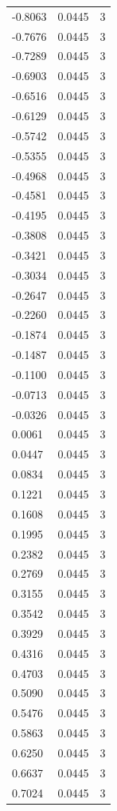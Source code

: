 \begin{longtable}{lrr}
  -0.8063 & 0.0445 & 3 \\
  -0.7676 & 0.0445 & 3 \\
  -0.7289 & 0.0445 & 3 \\
  -0.6903 & 0.0445 & 3 \\
  -0.6516 & 0.0445 & 3 \\
  -0.6129 & 0.0445 & 3 \\
  -0.5742 & 0.0445 & 3 \\
  -0.5355 & 0.0445 & 3 \\
  -0.4968 & 0.0445 & 3 \\
  -0.4581 & 0.0445 & 3 \\
  -0.4195 & 0.0445 & 3 \\
  -0.3808 & 0.0445 & 3 \\
  -0.3421 & 0.0445 & 3 \\
  -0.3034 & 0.0445 & 3 \\
  -0.2647 & 0.0445 & 3 \\
  -0.2260 & 0.0445 & 3 \\
  -0.1874 & 0.0445 & 3 \\
  -0.1487 & 0.0445 & 3 \\
  -0.1100 & 0.0445 & 3 \\
  -0.0713 & 0.0445 & 3 \\
  -0.0326 & 0.0445 & 3 \\
  0.0061 & 0.0445 & 3 \\
  0.0447 & 0.0445 & 3 \\
  0.0834 & 0.0445 & 3 \\
  0.1221 & 0.0445 & 3 \\
  0.1608 & 0.0445 & 3 \\
  0.1995 & 0.0445 & 3 \\
  0.2382 & 0.0445 & 3 \\
  0.2769 & 0.0445 & 3 \\
  0.3155 & 0.0445 & 3 \\
  0.3542 & 0.0445 & 3 \\
  0.3929 & 0.0445 & 3 \\
  0.4316 & 0.0445 & 3 \\
  0.4703 & 0.0445 & 3 \\
  0.5090 & 0.0445 & 3 \\
  0.5476 & 0.0445 & 3 \\
  0.5863 & 0.0445 & 3 \\
  0.6250 & 0.0445 & 3 \\
  0.6637 & 0.0445 & 3 \\
  0.7024 & 0.0445 & 3 \\

\end{longtable}
